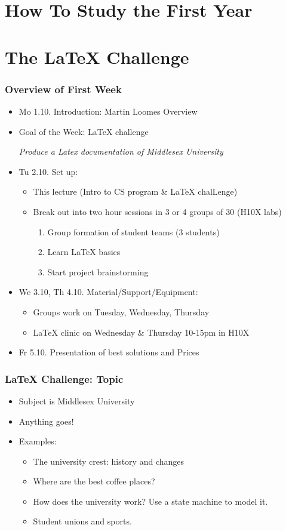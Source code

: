 \documentclass{beamer}
\begin{document}
\section{How To Study the First Year}


\section{The LaTeX Challenge}

\begin{frame}
\frametitle{Overview of First Week}
\begin{itemize}
\item \alert{Mo 1.10.} Introduction: Martin Loomes Overview
\item Goal of the Week: LaTeX challenge

\alert{\it Produce a Latex documentation of Middlesex University}

\item \alert{Tu 2.10.} Set up:
\begin{itemize}
\item This lecture (Intro to CS program \& LaTeX chalLenge)  
\item Break out into two hour sessions in 3 or 4 groups of 30 (H10X labs)
\begin{enumerate}
\item Group formation of student teams (3 students)
\item Learn LaTeX basics
\item Start project brainstorming
\end{enumerate}
\end{itemize}
\item \alert{We 3.10, Th 4.10.} Material/Support/Equipment:
\begin{itemize}
\item Groups work on Tuesday, Wednesday, Thursday 
\item LaTeX clinic on Wednesday \& Thursday 10-15pm in H10X
\end{itemize}
\item \alert{Fr 5.10.} Presentation of best solutions and Prices
\end{itemize}
\end{frame}

\begin{frame}
\frametitle{LaTeX Challenge: Topic}
\begin{itemize}
\item Subject is Middlesex University
\item Anything goes!
\item Examples: 
\begin{itemize}
\item The university crest: history and changes
\item Where are the best coffee places?
\item How does the university work? Use a state machine to model it.
\item Student unions and sports.
\end{itemize}
\end{itemize}
\end{frame}
\end{document}
